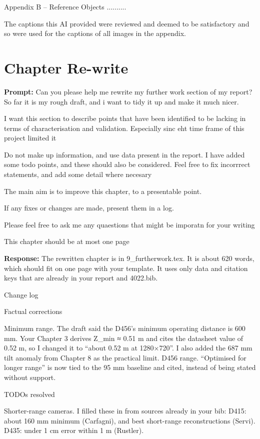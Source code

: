 Appendix B – Reference Objects ..........

The captions this AI provided were reviewed and deemed to be satisfactory and so were used for the captions of all images in the appendix.

\section{Chapter Re-write}
\textbf{Prompt:}
Can you please help me rewrite my further work section of my report? So far it is my rough draft, and i want to tidy it up and make it much nicer.
	
I want this section to describe points that have been identified to be lacking in terms of characterisation and validation. Especially sinc eht time frame of this project limited it
	
Do not make up information, and use data present in the report.  I have added some todo points, and these should also be considered. Feel free to fix incorrrect statements, and add some detail where necesary
	
The main aim is to improve this chapter, to a presentable point.
	
If any fixes or changes are made, present them in a log.
	
Please feel free to ask me any quaestions that might be imporatn for your writing
	
This chapter should be at most one page

\textbf{Response:}
The rewritten chapter is in 9\_furtherwork.tex. It is about 620 words, which should fit on one page with your template. It uses only data and citation keys that are already in your report and 4022.bib.
	
Change log
	
Factual corrections
	
Minimum range. The draft said the D456’s minimum operating distance is 600 mm. Your Chapter 3 derives Z\_min ≈ 0.51 m and cites the datasheet value of 0.52 m, so I changed it to “about 0.52 m at 1280×720”. I also added the 687 mm tilt anomaly from Chapter 8 as the practical limit.
D456 range. “Optimised for longer range” is now tied to the 95 mm baseline and cited, instead of being stated without support.
	
TODOs resolved
	
Shorter-range cameras. I filled these in from sources already in your bib:
D415: about 160 mm minimum (Carfagni), and best short-range reconstructions (Servi).
D435: under 1 cm error within 1 m (Rustler).
	
